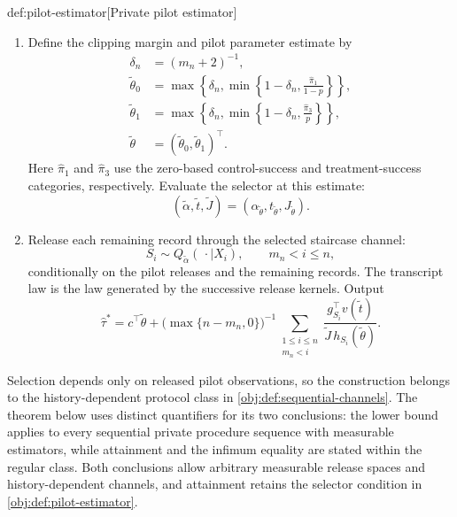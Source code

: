 \begin{algorithmv}{def:pilot-estimator}[Private pilot estimator]
\begin{enumerate}
\item Define the clipping margin and pilot parameter estimate by
\[
\begin{aligned}
\delta_n&=(m_n+2)^{-1},\\
\widetilde\theta_0
&=\max\left\{\delta_n,
\min\left\{1-\delta_n,\frac{\widehat\pi_1}{1-p}\right\}\right\},\\
\widetilde\theta_1
&=\max\left\{\delta_n,
\min\left\{1-\delta_n,\frac{\widehat\pi_3}{p}\right\}\right\},\\
\widetilde\theta
&=(\widetilde\theta_0,\widetilde\theta_1)^{\top}.
\end{aligned}
\]
Here \(\widehat\pi_1\) and \(\widehat\pi_3\) use the zero-based control-success and treatment-success categories, respectively. Evaluate the selector at this estimate:
\[
(\widetilde\alpha,\widetilde t,\widetilde J)
=
(\alpha_{\widetilde\theta},
t_{\widetilde\theta},
J_{\widetilde\theta}).
\]

\item Release each remaining record through the selected staircase channel:
\[
S_i\sim Q_{\widetilde\alpha}(\,\cdot\mid X_i),
\qquad m_n<i\le n,
\]
conditionally on the pilot releases and the remaining records. The transcript law is the law generated by the successive release kernels. Output
\[
\widehat\tau^*
=
c^{\top}\widetilde\theta
+\bigl(\max\{n-m_n,0\}\bigr)^{-1}
\sum_{\substack{1\le i\le n\\m_n<i}}
\frac{g_{S_i}^{\top}v(\widetilde t)}
{\widetilde J\,h_{S_i}(\widetilde\theta)}.
\]
\end{enumerate}
\end{algorithmv}

Selection depends only on released pilot observations, so the construction belongs to the history-dependent protocol class in \cref{obj:def:sequential-channels}. The theorem below uses distinct quantifiers for its two conclusions: the lower bound applies to every sequential private procedure sequence with measurable estimators, while attainment and the infimum equality are stated within the regular class. Both conclusions allow arbitrary measurable release spaces and history-dependent channels, and attainment retains the selector condition in \cref{obj:def:pilot-estimator}.

